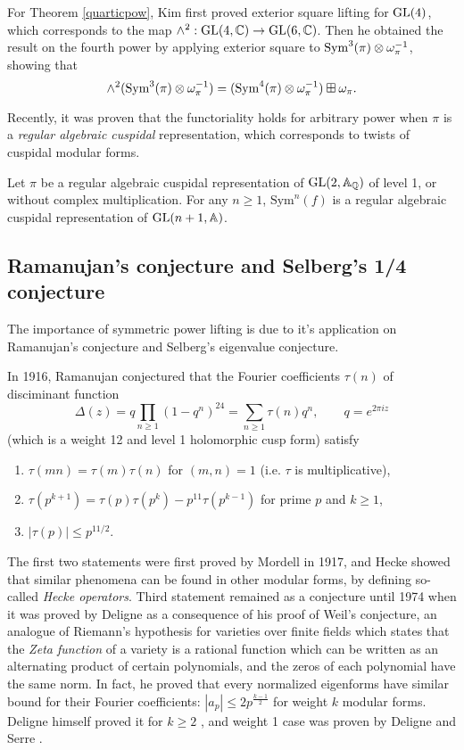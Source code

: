 For Theorem \ref{quarticpow}, Kim first proved exterior square lifting for $\operatorname{\mathrm{GL}}(4)$, which corresponds to the map $\wedge^{2}:\operatorname{\mathrm{GL}}(4, \mathbb{C}) \to \operatorname{\mathrm{GL}}(6, \mathbb{C})$.
Then he obtained the result on the fourth power by applying exterior square to $\mathrm{Sym}^{3}(\pi) \otimes \omega_{\pi}^{-1}$, showing that 
$$
\wedge^{2}(\mathrm{Sym}^{3}(\pi) \otimes \omega_{\pi}^{-1}) = (\mathrm{Sym}^{4}(\pi) \otimes \omega_{\pi}^{-1}) \boxplus \omega_{\pi}.
$$

Recently, it was proven that the functoriality holds for arbitrary power when $\pi$ is a \emph{regular algebraic cuspidal} representation,
which corresponds to twists of cuspidal modular forms.
\begin{theorem}
Let $\pi$ be a regular algebraic cuspidal representation of $\operatorname{\mathrm{GL}}(2, \mathbb{A}_{\mathbb{Q}})$ of level 1, or without complex multiplication.
For any $n\geq 1$, $\mathrm{Sym}^{n}(f)$ is a regular algebraic cuspidal representation of $\operatorname{\mathrm{GL}}(n + 1, \mathbb{A})$.
\end{theorem}


\subsection{Ramanujan's conjecture and Selberg's 1/4 conjecture}

The importance of symmetric power lifting is due to it's application on Ramanujan's conjecture and Selberg's eigenvalue conjecture.

In 1916, Ramanujan conjectured that the Fourier coefficients $\tau(n)$ of disciminant function
$$
\Delta(z) = q\prod_{n\geq 1}(1 - q^{n})^{24} = \sum_{n\geq 1}\tau(n)q^{n}, \qquad q = e^{2\pi i z}
$$
(which is a weight 12 and level 1 holomorphic cusp form) satisfy
\begin{enumerate}
    \item $\tau(mn) = \tau(m)\tau(n)$ for $(m, n) =1$ (i.e. $\tau$ is multiplicative),
    \item $\tau(p^{k+1}) = \tau(p)\tau(p^{k}) - p^{11}\tau(p^{k-1})$ for prime $p$ and $k\geq 1$,
    \item $|\tau(p)|\leq p^{11/2}$.
\end{enumerate}
The first two statements were first proved by Mordell in 1917, and Hecke showed that 
similar phenomena can be found in other modular forms, by defining so-called \emph{Hecke operators}.
Third statement remained as a conjecture until 1974 when it was proved by Deligne
as a consequence of his proof of Weil's conjecture, an analogue of Riemann's hypothesis for varieties over finite fields
which states that the \emph{Zeta function} of a variety is a rational function which can be written as
an alternating product of certain polynomials, and the zeros of each polynomial have the same norm.
In fact, he proved that every normalized eigenforms have similar bound for their Fourier coefficients: 
$|a_{p}| \leq 2p^{\frac{k-1}{2}}$ for weight $k$ modular forms.
Deligne himself proved it for $k\geq 2$ \cite{deligne1971formes},
and weight 1 case was proven by Deligne and Serre \cite{deligne1974formes}.


